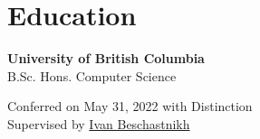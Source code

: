 \section{Education}
\begin{minipage}[t]{0.45\textwidth}
    \textbf{University of British Columbia} \\
    B.Sc. Hons. Computer Science
\end{minipage}
\begin{minipage}[t]{0.55\textwidth}
    \begin{flushright}
    Conferred on May 31, 2022 with Distinction \\
    Supervised by \href{https://www.cs.ubc.ca/~bestchai/}{Ivan Beschastnikh}
    \end{flushright}
\end{minipage}